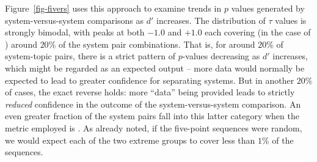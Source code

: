 Figure~\ref{fig-fivers} uses this approach to examine trends in $p$
values generated by system-versus-system comparisons as $d'$
increases.
The distribution of $\tau$ values is strongly bimodal, with peaks at
both $-1.0$ and $+1.0$ each covering (in the case of {\ap}) around
$20\%$ of the system pair combinations.
That is, for around $20$\% of system-topic pairs, there is a strict
pattern of $p$-values decreasing as $d'$ increases, which might be regarded
as an expected output -- more data would normally be expected to lead
to greater confidence for separating systems.
But in another $20$\% of cases, the exact reverse holds: more
``data'' being provided leads to strictly {\emph{reduced}} confidence
in the outcome of the system-versus-system comparison.
An even greater fraction of the system pairs fall into this latter
category when the metric employed is {\rbp}.
As already noted, if the five-point sequences were random, we would
expect each of the two extreme groups to cover less than $1$\% of the
sequences.

